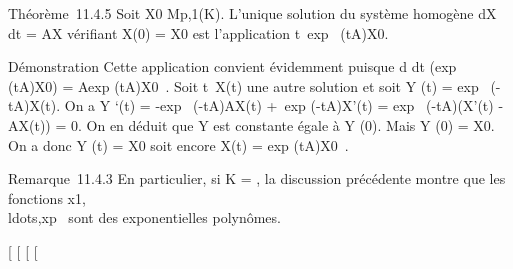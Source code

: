 Théorème~11.4.5 Soit X0 \in Mp,1(K). L'unique solution
du système homogène  dX \over dt = AX vérifiant X(0)
= X0 est l'application
t\mapsto~exp~
(tA)X0.

Démonstration Cette application convient évidemment puisque  d
\over dt (exp~
(tA)X0) = Aexp (tA)X0~.
Soit t\mapsto~X(t) une autre solution et soit Y (t)
= exp~ (-tA)X(t). On a Y `(t) =
-exp~ (-tA)AX(t) +\
exp (-tA)X'(t) = exp~ (-tA)(X'(t) - AX(t)) =
0. On en déduit que Y est constante égale à Y (0). Mais Y (0) =
X0. On a donc Y (t) = X0 soit encore X(t)
= exp (tA)X0~.

Remarque~11.4.3 En particulier, si K = , la discussion précédente
montre que les fonctions
x1,\\ldots,xp~
sont des exponentielles polynômes.

{[}
{[}
{[}
{[}
